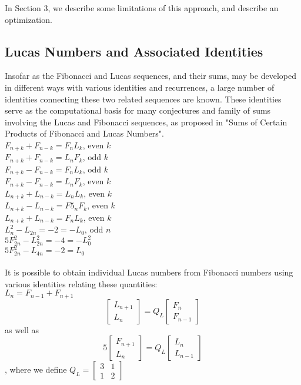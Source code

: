 \documentclass[11pt]{article}
\begin{document}
In Section 3, we describe some limitations of this approach, and describe an optimization.

\subsection{Lucas Numbers and Associated Identities}

Insofar as the Fibonacci and Lucas sequences, and their sums, may be developed in different ways with various identities and recurrences, a large number of identities connecting these two related sequences are known. These identities serve as the computational basis for many conjectures and family of sums involving the Lucas and Fibonacci sequences, as proposed in "Sums of Certain Products of Fibonacci and Lucas Numbers". \\
$F_{n+k} + F_{n-k} = F_{n}L_{k}$, even $k$\\
$F_{n+k} + F_{n-k} = L_{n}F_{k}$, odd $k$\\$F_{n+k} - F_{n-k} = F_{n}L_{k}$, odd $k$ \\ $F_{n+k} - F_{n-k} = L_{n}F_{k}$, even $k$ \\ $L_{n+k} + L_{n-k} = L_{n}L_{k}$, even $k$ \\ $L_{n+k} - L_{n-k}= F5_{n}F_{k}$, even $k$ \\ $L_{n+k} + L_{n-k} = F_{n}L_{k}$, even $k$\\ $L_{n}^{2} - L_{2n} = -2 = -L_{0}$, odd $n$\\ $5F_{2n}^{2} - L_{2n}^{2} = -4 = -L_{0}^{2}$\\ $5F_{2n}^{2} - L_{4n} = -2 = L_{0}$\\\\  It is possible to obtain individual Lucas numbers from Fibonacci numbers using various identities relating these quantities:\\$L_{n} = F_{n-1} + F_{n+1}$ \\ 
\[
\begin{bmatrix}
L_{n+1} \\
L_{n}
\end{bmatrix} = Q_{L} \begin{bmatrix} F_{n} \\ F_{n-1}\end{bmatrix}
\] 
as well as \\
\[
5\begin{bmatrix}
F_{n+1} \\
L_{n}
\end{bmatrix} = Q_{L} \begin{bmatrix} L_{n} \\ L_{n-1}\end{bmatrix}
\] , where we define $Q_{L} = \begin{bmatrix} 3 & 1 \\ 1 & 2 \end{bmatrix}$
\end{document}
